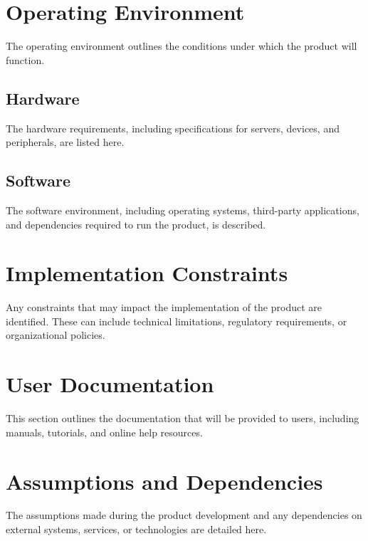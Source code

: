 \section{Operating Environment}
The operating environment outlines the conditions under which the product will function.

\subsection{Hardware}
The hardware requirements, including specifications for servers, devices, and peripherals, are listed here.

\subsection{Software}
The software environment, including operating systems, third-party applications, and dependencies required to run the product, is described.

\section{Implementation Constraints}
Any constraints that may impact the implementation of the product are identified. These can include technical limitations, regulatory requirements, or organizational policies.

\section{User Documentation}
This section outlines the documentation that will be provided to users, including manuals, tutorials, and online help resources.

\section{Assumptions and Dependencies}
The assumptions made during the product development and any dependencies on external systems, services, or technologies are detailed here.
